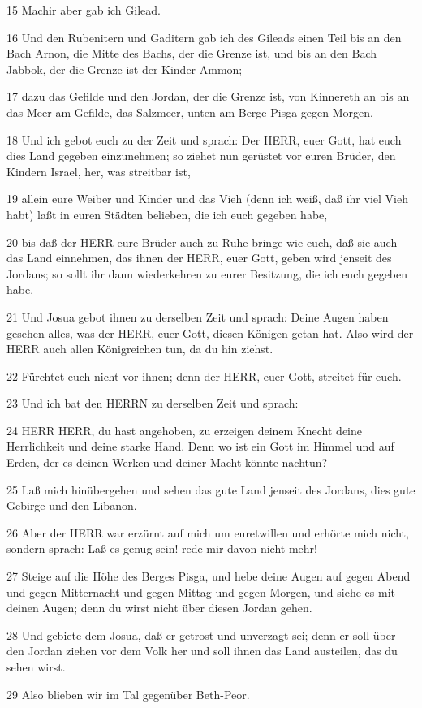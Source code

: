 \par 15 Machir aber gab ich Gilead.
\par 16 Und den Rubenitern und Gaditern gab ich des Gileads einen Teil bis an den Bach Arnon, die Mitte des Bachs, der die Grenze ist, und bis an den Bach Jabbok, der die Grenze ist der Kinder Ammon;
\par 17 dazu das Gefilde und den Jordan, der die Grenze ist, von Kinnereth an bis an das Meer am Gefilde, das Salzmeer, unten am Berge Pisga gegen Morgen.
\par 18 Und ich gebot euch zu der Zeit und sprach: Der HERR, euer Gott, hat euch dies Land gegeben einzunehmen; so ziehet nun gerüstet vor euren Brüder, den Kindern Israel, her, was streitbar ist,
\par 19 allein eure Weiber und Kinder und das Vieh (denn ich weiß, daß ihr viel Vieh habt) laßt in euren Städten belieben, die ich euch gegeben habe,
\par 20 bis daß der HERR eure Brüder auch zu Ruhe bringe wie euch, daß sie auch das Land einnehmen, das ihnen der HERR, euer Gott, geben wird jenseit des Jordans; so sollt ihr dann wiederkehren zu eurer Besitzung, die ich euch gegeben habe.
\par 21 Und Josua gebot ihnen zu derselben Zeit und sprach: Deine Augen haben gesehen alles, was der HERR, euer Gott, diesen Königen getan hat. Also wird der HERR auch allen Königreichen tun, da du hin ziehst.
\par 22 Fürchtet euch nicht vor ihnen; denn der HERR, euer Gott, streitet für euch.
\par 23 Und ich bat den HERRN zu derselben Zeit und sprach:
\par 24 HERR HERR, du hast angehoben, zu erzeigen deinem Knecht deine Herrlichkeit und deine starke Hand. Denn wo ist ein Gott im Himmel und auf Erden, der es deinen Werken und deiner Macht könnte nachtun?
\par 25 Laß mich hinübergehen und sehen das gute Land jenseit des Jordans, dies gute Gebirge und den Libanon.
\par 26 Aber der HERR war erzürnt auf mich um euretwillen und erhörte mich nicht, sondern sprach: Laß es genug sein! rede mir davon nicht mehr!
\par 27 Steige auf die Höhe des Berges Pisga, und hebe deine Augen auf gegen Abend und gegen Mitternacht und gegen Mittag und gegen Morgen, und siehe es mit deinen Augen; denn du wirst nicht über diesen Jordan gehen.
\par 28 Und gebiete dem Josua, daß er getrost und unverzagt sei; denn er soll über den Jordan ziehen vor dem Volk her und soll ihnen das Land austeilen, das du sehen wirst.
\par 29 Also blieben wir im Tal gegenüber Beth-Peor.

